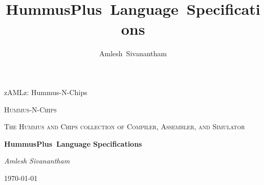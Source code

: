 \documentclass[12pt,journal,compsoc]{article}
\begin{document}
\title{HummusPlus~Language~Specifications}
\author{Amlesh~Sivanantham}
\date{}

{zAMLz: Hummus-N-Chips}




\begin{titlepage}
  \begin{center}
    \vfill
    {\scshape\LARGE Hummus-N-Chips \par}
    \vspace{1cm}
    {\scshape\Large The Hummus and Chips collection of Compiler, Assembler, 
                    and Simulator\par}
    \vspace{1.5cm}
    {\huge\bfseries HummusPlus~Language Specifications\par}
    \vspace{2cm}
    {\Large\itshape Amlesh Sivanantham\par}
    \vspace{1cm}
    {\large \today\par}
  \end{center}
\end{titlepage}

\clearpage

\maketitle
\end{document}
